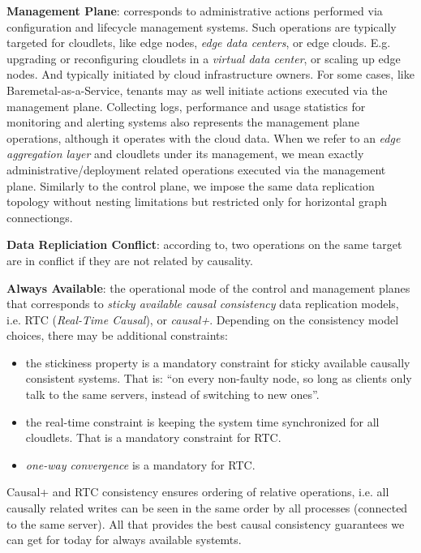 \documentclass[conference]{IEEEtran}
\begin{document}
\textbf{Management Plane}: corresponds to administrative actions performed via
configuration and lifecycle management systems. Such operations are typically
targeted for cloudlets, like edge nodes, \textit{edge data centers}\cite{b3},
or edge clouds. E.g. upgrading or reconfiguring cloudlets in a \textit{virtual
data center}\cite{b3}, or scaling up edge nodes. And typically initiated by
cloud infrastructure owners. For some cases, like Baremetal-as-a-Service,
tenants may as well initiate actions executed via the management plane.
Collecting logs, performance and usage statistics for monitoring and alerting
systems also represents the management plane operations, although it operates
with the cloud data. When we refer to an \textit{edge aggregation
layer}\cite{b3} and cloudlets under its management, we mean exactly
administrative/deployment related operations executed via the management plane.
Similarly to the control plane, we impose the same data replication topology
without nesting limitations but restricted only for horizontal graph
connectiongs.

\textbf{Data Repliciation Conflict}: according to\cite{b1}, two operations on
the same target are in conflict if they are not related by causality.

\textbf{Always Available}: the operational mode of the control and management
planes that corresponds to \textit{sticky available causal
consistency}\cite{b4} data replication models, i.e. RTC (\textit{Real-Time
Causal}\cite{b2}), or \textit{causal+}\cite{b1}. Depending on the consistency
model choices, there may be additional constraints:

\begin{itemize}
  \item the stickiness property is a mandatory constraint for sticky available
    causally consistent systems. That is: ``on every non-faulty node, so long
    as clients only talk to the same servers, instead of switching to new
    ones''\cite{b4}.
  \item the real-time constraint is keeping the system time synchronized for
    all cloudlets. That is a mandatory constraint for RTC.
  \item \textit{one-way convergence}\cite{b2} is a mandatory for RTC.
\end{itemize}

Causal+ and RTC consistency ensures ordering of relative operations, i.e.
all causally related writes can be seen in the same order by all processes
(connected to the same server). All that provides the best causal consistency
guarantees we can get for today for always available systemts.
\end{document}
